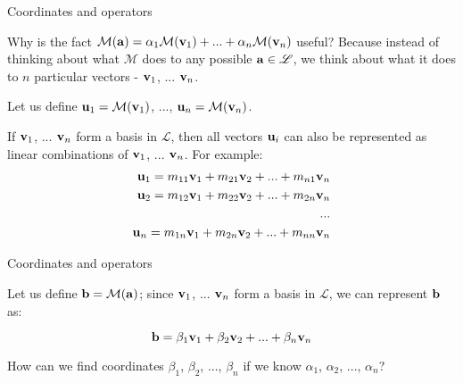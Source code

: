 \documentclass{beamer}
\begin{document}
\begin{frame}{Coordinates and operators}
	\begin{flushleft}
		
		Why is the fact
		$
			\mathcal{M}(\mathbf{a}) = 
			\alpha_1 \mathcal{M}(\mathbf{v}_1) + ... + \alpha_n \mathcal{M}(\mathbf{v}_n)
		$ 
		useful? Because instead of thinking about what $\mathcal{M}$ does to any possible $\mathbf{a} \in \mathscr{L}$, we think about what it does to $n$ particular vectors - $\mathbf{v}_1$, ... $\mathbf{v}_n$.
		
		\bigskip
		
		Let us define $\mathbf{u}_1 = \mathcal{M}(\mathbf{v}_1)$, ..., $\mathbf{u}_n = \mathcal{M}(\mathbf{v}_n)$.
		
		\bigskip
			
		If $\mathbf{v}_1$, ... $\mathbf{v}_n$ form a basis in $\mathscr{L}$, then all vectors $\mathbf{u}_i$ can also be represented as linear combinations of $\mathbf{v}_1$, ... $\mathbf{v}_n$. For example:
		\begin{align*}
			\mathbf{u}_1 = m_{11} \mathbf{v}_1 + m_{21}  \mathbf{v}_2 + ... + m_{n1} \mathbf{v}_n \\
			\mathbf{u}_2 = m_{12} \mathbf{v}_1 + m_{22}  \mathbf{v}_2 + ... + m_{2n} \mathbf{v}_n \\
			 ... \\
			 \mathbf{u}_n = m_{1n} \mathbf{v}_1 + m_{2n}  \mathbf{v}_2 + ... + m_{nn} \mathbf{v}_n
		\end{align*}
		
		
	\end{flushleft}
\end{frame}




\begin{frame}{Coordinates and operators}
	\begin{flushleft}
		
		Let us define $\mathbf{b} = \mathcal{M}(\mathbf{a})$; since $\mathbf{v}_1$, ... $\mathbf{v}_n$ form a basis in $\mathscr{L}$, we can represent $\mathbf{b}$ as:
		
		\begin{equation}
			\mathbf{b} = \beta_1 \mathbf{v}_1 + \beta_2 \mathbf{v}_2 + ... + \beta_n \mathbf{v}_n 
		\end{equation}		
	
		How can we find coordinates $\beta_1$, $\beta_2$, ..., $\beta_n$ if we know $\alpha_1$, $\alpha_2$, ..., $\alpha_n$?
		
		
	\end{flushleft}
\end{frame}
\end{document}
